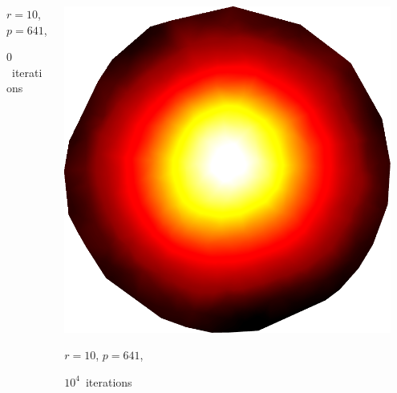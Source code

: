 \documentclass[aspectratio=169,t]{beamer}
\begin{document}
{\begin{columns}
\begin{column}{0.22\textwidth}
			{\footnotesize
				\par \vspace{-1mm} $r=10$, $p=641$,
				\par \vspace{-1mm} $0$~iterations
			}
		\end{column}
		\begin{column}{0.22\textwidth}
			\centering
			\includegraphics[width=.85\textwidth]{data/synthetic_meshes/random_circle_tessellation_Dirac_delta_10_v641_f1252_funcvals_10000iter.png}
			{\footnotesize
				\par \vspace{-1mm} $r=10$, $p=641$,
				\par \vspace{-1mm} $10^4$~iterations
			}
		\end{column}
		\begin{column}{0.17\textwidth}~\end{column}
	\end{columns}
}
\end{document}
